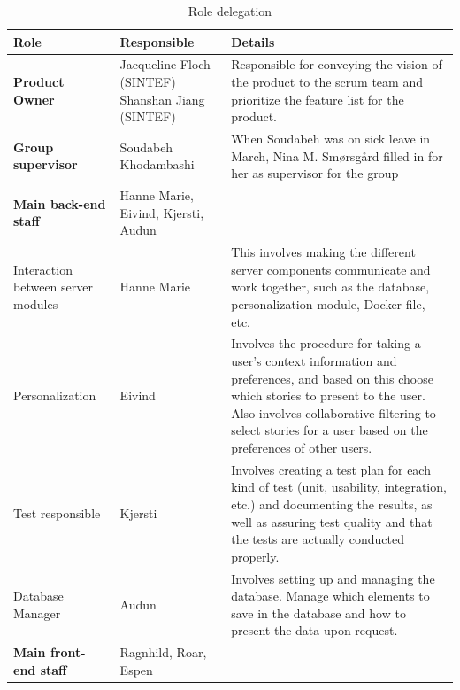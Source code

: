 \begin{table}[!h]
	\small
	\centering
	\caption{Role delegation}
		\begin{adjustbox}{center}
		\begin{tabular}{ | p{2.5cm} | p{2.8cm} | p{12cm} |}
			\hline
			\textbf{Role} & \textbf{Responsible} & \textbf{Details} \\ \hline
			
			\textbf{Product Owner} & Jacqueline Floch (SINTEF) \newline Shanshan Jiang (SINTEF) & Responsible for conveying the vision of the product to the scrum team and prioritize the feature list for the product. \cite{Scrum}  \\ \hline
			
			\textbf{Group supervisor} & Soudabeh Khodambashi & When Soudabeh was on sick leave in March, Nina M. Smørsgård filled in for her as supervisor for the group\\ \hline
			
			\textbf{Main back-end staff} & Hanne Marie, Eivind, Kjersti, Audun & \\ \hline
			
			Interaction between server modules & Hanne Marie & This involves making the different server components communicate and work together, such as the database, personalization module, Docker file, etc. \\ \hline
			
			Personalization & Eivind & Involves the procedure for taking a user's context information and preferences, and based on this choose which stories to present to the user. Also involves collaborative filtering to select stories for a user based on the preferences of other users. \\ \hline
			
			Test responsible & Kjersti & Involves creating a test plan for each kind of test (unit, usability, integration, etc.) and documenting the results, as well as assuring test quality and that the tests are actually conducted properly. \\ \hline
			
			Database Manager & Audun & Involves setting up and managing the database. Manage which elements to save in the database and how to present the data upon request. \\ \hline
			
			\textbf{Main front-end staff} & Ragnhild, Roar, Espen & \\ \hline
			

\end{tabular}
\end{adjustbox}
\end{table}
